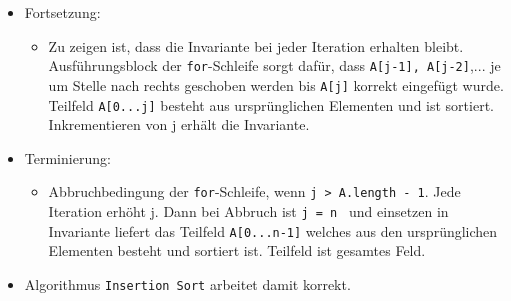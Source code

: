 \begin{itemize}
\begin{itemize}
                \item Fortsetzung:
                    \begin{itemize}
                        \item   Zu zeigen ist, dass die Invariante bei jeder Iteration erhalten bleibt. Ausführungsblock der \texttt{for}-Schleife
                                sorgt dafür, dass \texttt{A[j-1], A[j-2]},... je um Stelle nach rechts geschoben werden bis \texttt{A[j]} korrekt eingefügt wurde. 
                                Teilfeld \texttt{A[0...j]} besteht aus ursprünglichen Elementen und ist sortiert. Inkrementieren von j erhält die Invariante.
                    \end{itemize}

                \item Terminierung: 
                    \begin{itemize}
                        \item   Abbruchbedingung der \texttt{for}-Schleife, wenn \texttt{j > A.length - 1}. Jede Iteration erhöht j.
                                Dann bei Abbruch ist \texttt{j = n } und einsetzen in Invariante liefert das Teilfeld \texttt{A[0...n-1]}
                                welches aus den ursprünglichen Elementen besteht und sortiert ist. Teilfeld ist gesamtes Feld.
                    \end{itemize}

                \item Algorithmus \texttt{Insertion Sort} arbeitet damit korrekt.
                
            \end{itemize}
        

\end{itemize}
